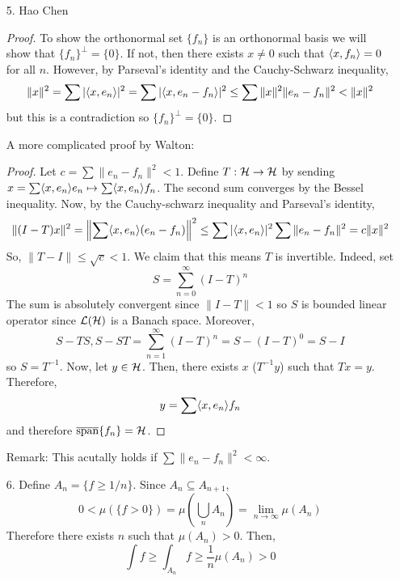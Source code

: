 \begin{itemize}

\item[5.] Hao Chen
\begin{proof}
To show the orthonormal set $\{f_n\}$ is an orthonormal basis we will show that $\{f_n\}^\perp = \{0\}$. If not, then there exists $x \ne 0$ such that $\langle x,f_n\rangle = 0$ for all $n$. However, by Parseval's identity and the Cauchy-Schwarz inequality,
	\[ \|x\|^2 = \sum |\langle x,e_n\rangle|^2 = \sum | \langle x,e_n-f_n\rangle|^2 \le \sum \|x\|^2\|e_n-f_n\|^2 < \|x\|^2 \]
but this is a contradiction so $\{f_n\}^\perp = \{0\}$.
\end{proof}

A more complicated proof by Walton:
\begin{proof}
Let $ c = \sum \|e_n-f_n\|^2 <1$. Define $T: \mathcal{H} \to \mathcal{H}$ by sending $x = \sum \langle x,e_n\rangle e_n \mapsto \sum \langle x,e_n\rangle f_n$. The second sum converges by the Bessel inequality. Now, by the Cauchy-schwarz inequality and Parseval's identity,
	\[ \| (I-T)x \|^2 = \left\| \sum \langle x ,e_n \rangle (e_n-f_n) \right\|^2 \le \sum |\langle x,e_n\rangle|^2 \sum \| e_n-f_n\|^2 = c\|x\|^2 \]
So, $\|T-I\| \le \sqrt{c} <1$. We claim that this means $T$ is invertible. Indeed, set
	\[ S = \sum_{n=0}^\infty (I-T)^n \]
The sum is absolutely convergent since $\|I-T\| <1$ so $S$ is bounded linear operator since $\mathcal{L}(\mathcal{H})$ is a Banach space. Moreover,
	\[ S-TS,S-ST = \sum_{n=1}^\infty (I-T)^n = S-(I-T)^0 = S-I \]
so $S=T^{-1}$. Now, let $y \in \mathcal{H}$. Then, there exists $x$ ($T^{-1}y$) such that $Tx=y$. Therefore,
	\begin{equation}\label{exp} y = \sum \langle x,e_n\rangle f_n \end{equation}
and therefore $\overline{\text{span}}\{f_n\} = \mathcal{H}$.
\end{proof}
Remark: This acutally holds if $\sum \|e_n-f_n\|^2 < \infty$.

\item[6.] Define $A_n = \{ f \ge 1/n\}$. Since $A_n \subseteq A_{n+1}$,
		\[ 0 < \mu(\{f >0 \}) = \mu \left( \bigcup_n A_n \right) = \lim_{n \to \infty} \mu(A_n) \]
	Therefore there exists $n$ such that $\mu(A_n) >0$. Then,
		\[ \int f \ge \int_{A_n} f \ge \dfrac 1n \mu(A_n) > 0 \]


\end{itemize}
